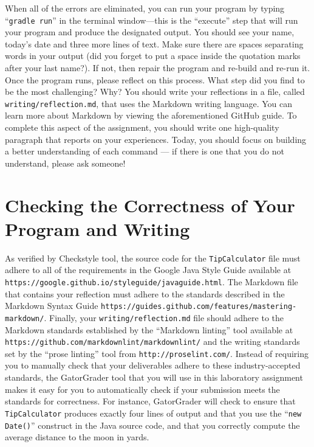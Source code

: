 \documentclass[11pt]{article}
\newcommand{\mainprogram}{\lstinline{TipCalculator}}
\newcommand{\reflection}{\lstinline{writing/reflection.md}}
\newcommand{\gradlerun}{\command{gradle run}}
\newcommand{\command}[1]{``\lstinline{#1}''}
\newcommand{\url}[1]{\lstinline{#1}}
\newcommand{\step}[1]{``{#1}''}
\begin{document}
When all of the errors are eliminated, you can run your program by typing \gradlerun{} in the terminal window---this is
the ``execute'' step that will run your program and produce the designated output. You should see your name, today's
date and three more lines of text. Make sure there are spaces separating words in your output (did you forget to put a
space inside the quotation marks after your last name?). If not, then repair the program and re-build and re-run it.
Once the program runs, please reflect on this process. What step did you find to be the most challenging? Why? You
should write your reflections in a file, called \reflection{}, that uses the Markdown writing language. You can learn
more about Markdown by viewing the aforementioned GitHub guide. To complete this aspect of the assignment, you should
write one high-quality paragraph that reports on your experiences. Today, you should focus on building a better
understanding of each command --- if there is one that you do not understand, please ask someone!

\section*{Checking the Correctness of Your Program and Writing}

As verified by Checkstyle tool, the source code for the \mainprogram{} file must adhere to all of the requirements in
the Google Java Style Guide available at \url{https://google.github.io/styleguide/javaguide.html}. The Markdown file
that contains your reflection must adhere to the standards described in the Markdown Syntax Guide
\url{https://guides.github.com/features/mastering-markdown/}. Finally, your \reflection{} file should adhere to the
Markdown standards established by the \step{Markdown linting} tool available at
\url{https://github.com/markdownlint/markdownlint/} and the writing standards set by the \step{prose linting} tool from
\url{http://proselint.com/}. Instead of requiring you to manually check that your deliverables adhere to these
industry-accepted standards, the GatorGrader tool that you will use in this laboratory assignment makes it easy for you
to automatically check if your submission meets the standards for correctness. For instance, GatorGrader will check to
ensure that \mainprogram{} produces exactly four lines of output and that you use the \command{new Date()} construct in
the Java source code, and that you correctly compute the average distance to the moon in yards.
\end{document}
